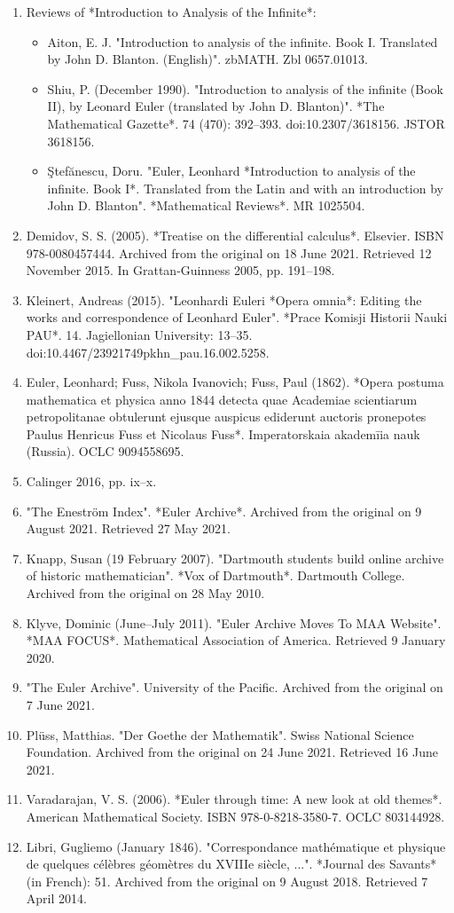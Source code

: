 \begin{enumerate}
\item Reviews of *Introduction to Analysis of the Infinite*:
\begin{itemize}
\item Aiton, E. J. "Introduction to analysis of the infinite. Book I. Translated by John D. Blanton. (English)". zbMATH. Zbl 0657.01013.
\item Shiu, P. (December 1990). "Introduction to analysis of the infinite (Book II), by Leonard Euler (translated by John D. Blanton)". *The Mathematical Gazette*. 74 (470): 392–393. doi:10.2307/3618156. JSTOR 3618156.
\item Ştefănescu, Doru. "Euler, Leonhard *Introduction to analysis of the infinite. Book I*. Translated from the Latin and with an introduction by John D. Blanton". *Mathematical Reviews*. MR 1025504.
\end{itemize}
\item Demidov, S. S. (2005). *Treatise on the differential calculus*. Elsevier. ISBN 978-0080457444. Archived from the original on 18 June 2021. Retrieved 12 November 2015. In Grattan-Guinness 2005, pp. 191–198.
\item Kleinert, Andreas (2015). "Leonhardi Euleri *Opera omnia*: Editing the works and correspondence of Leonhard Euler". *Prace Komisji Historii Nauki PAU*. 14. Jagiellonian University: 13–35. doi:10.4467/23921749pkhn_pau.16.002.5258.
\item Euler, Leonhard; Fuss, Nikola Ivanovich; Fuss, Paul (1862). *Opera postuma mathematica et physica anno 1844 detecta quae Academiae scientiarum petropolitanae obtulerunt ejusque auspicus ediderunt auctoris pronepotes Paulus Henricus Fuss et Nicolaus Fuss*. Imperatorskaia akademīia nauk (Russia). OCLC 9094558695.
\item Calinger 2016, pp. ix–x.
\item "The Eneström Index". *Euler Archive*. Archived from the original on 9 August 2021. Retrieved 27 May 2021.
\item Knapp, Susan (19 February 2007). "Dartmouth students build online archive of historic mathematician". *Vox of Dartmouth*. Dartmouth College. Archived from the original on 28 May 2010.
\item Klyve, Dominic (June–July 2011). "Euler Archive Moves To MAA Website". *MAA FOCUS*. Mathematical Association of America. Retrieved 9 January 2020.
\item "The Euler Archive". University of the Pacific. Archived from the original on 7 June 2021.
\item Plüss, Matthias. "Der Goethe der Mathematik". Swiss National Science Foundation. Archived from the original on 24 June 2021. Retrieved 16 June 2021.
\item Varadarajan, V. S. (2006). *Euler through time: A new look at old themes*. American Mathematical Society. ISBN 978-0-8218-3580-7. OCLC 803144928.
\item Libri, Gugliemo (January 1846). "Correspondance mathématique et physique de quelques célèbres géomètres du XVIIIe siècle, ...". *Journal des Savants* (in French): 51. Archived from the original on 9 August 2018. Retrieved 7 April 2014.
\end{enumerate}